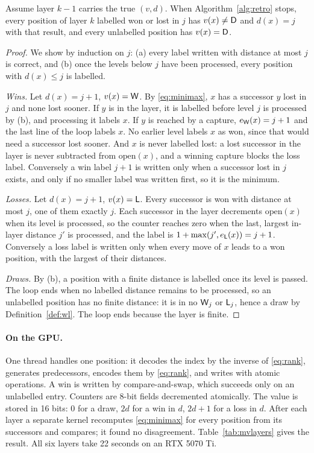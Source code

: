 \begin{theorem}\label{thm:retro}
Assume layer $k - 1$ carries the true $(v, d)$. When Algorithm~\ref{alg:retro} stops, every position of layer
$k$ labelled won or lost in $j$ has $v(x) \neq \mathsf{D}$ and $d(x) = j$ with that result, and every unlabelled position
has $v(x) = \mathsf{D}$.
\end{theorem}

\begin{proof}
We show by induction on $j$: (a) every label written with distance at most $j$ is correct, and (b) once the
levels below $j$ have been processed, every position with $d(x) \le j$ is labelled.

\emph{Wins.} Let $d(x) = j + 1$, $v(x) = \mathsf{W}$. By \eqref{eq:minimax}, $x$ has a successor $y$ lost in $j$ and none lost
sooner. If $y$ is in the layer, it is labelled before level $j$ is processed by (b), and processing it labels
$x$. If $y$ is reached by a capture, $e_{\mathsf{W}}(x) = j + 1$ and the last line of the loop labels $x$. No earlier level
labels $x$ as won, since that would need a successor lost sooner. And $x$ is never labelled lost: a lost
successor in the layer is never subtracted from $\text{open}(x)$, and a winning capture blocks the loss label.
Conversely a win label $j + 1$ is written
only when a successor lost in $j$ exists, and only if no smaller label was written first, so it is the
minimum.

\emph{Losses.} Let $d(x) = j + 1$, $v(x) = \mathsf{L}$. Every successor is won with distance at most $j$, one of them
exactly $j$. Each successor in the layer decrements $\text{open}(x)$ when its level is processed, so the
counter reaches zero when the last, largest in-layer distance $j'$ is processed, and the label is
$1 + \max(j', e_{\mathsf{L}}(x)) = j + 1$. Conversely a loss label is written only when every move of $x$ leads to a won
position, with the largest of their distances.

\emph{Draws.} By (b), a position with a finite distance is labelled once its level is passed. The loop ends
when no labelled distance remains to be processed, so an unlabelled position has no finite distance: it is in
no $\mathsf{W}_j$ or $\mathsf{L}_j$, hence a draw by Definition~\ref{def:wl}. The loop ends because the layer is finite.
\end{proof}

\paragraph{On the GPU.} One thread handles one position: it decodes the index by the inverse of
\eqref{eq:rank}, generates predecessors, encodes them by \eqref{eq:rank}, and writes with atomic operations. A
win is written by compare-and-swap, which succeeds only on an unlabelled entry. Counters are 8-bit fields
decremented atomically. The value is stored in 16 bits: 0 for a draw, $2d$ for a win in $d$, $2d + 1$ for a
loss in $d$. After each layer a separate kernel recomputes \eqref{eq:minimax} for every position from its
successors and compares; it found no disagreement. Table~\ref{tab:mvlayers} gives the result. All six layers
take 22 seconds on an RTX 5070 Ti.


